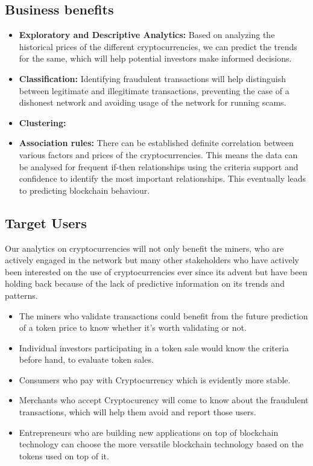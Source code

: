 \documentclass{article}
\begin{document}
\subsection{Business benefits}
\begin{itemize}
    \item \textbf{Exploratory and Descriptive Analytics:} Based on analyzing the historical prices of the different cryptocurrencies, we can predict the trends for the same, which will help potential investors make informed decisions.
    \item \textbf{Classification:} Identifying fraudulent transactions will help distinguish between legitimate and illegitimate transactions, preventing the case of a dishonest network and avoiding usage of the network for running scams.
    \item \textbf{Clustering:}
    \item \textbf{Association rules:} There can be established definite correlation between various factors and prices of the cryptocurrencies. This means the data can be analysed for frequent if-then relationships using the criteria support and confidence to identify the most important relationships. This eventually leads to predicting blockchain behaviour.
\end{itemize}
\subsection{Target Users}
Our analytics on cryptocurrencies will not only benefit the miners, who are actively engaged in the network but many other stakeholders who have actively been interested on the use of cryptocurrencies ever since its advent but have been holding back because of the lack of predictive information on its trends and patterns.
\begin{itemize}
    \item The miners who validate transactions could benefit from the future prediction of a token price to know whether it's worth validating or not.
    \item Individual investors participating in a token sale would know the criteria before hand, to evaluate token sales.
    \item Consumers who pay with Cryptocurrency which is evidently more stable.
    \item Merchants who accept Cryptocurency will come to know about the fraudulent transactions, which will help them avoid and report those users.
    \item Entrepreneurs who are building new applications on top of blockchain technology can choose the more versatile blockchain technology based on the tokens used on top of it. 
\end{itemize}
\end{document}
